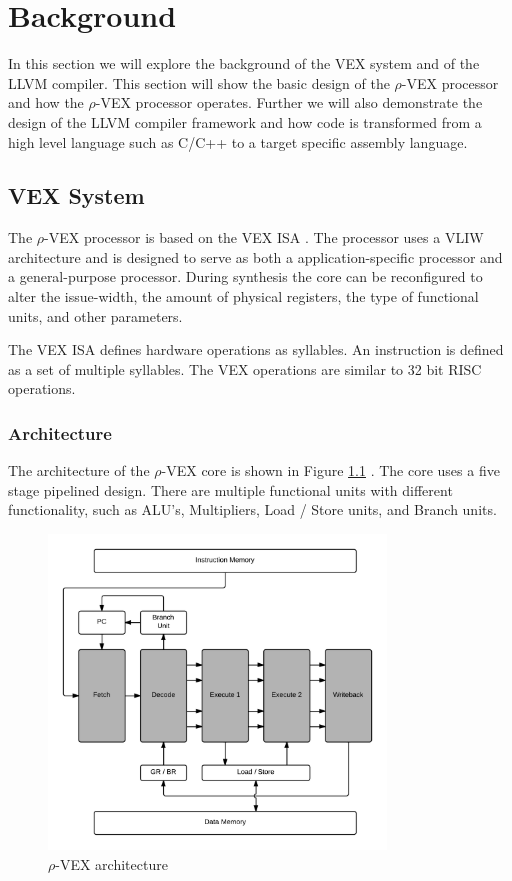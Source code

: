 \chapter{Background}
\label{chap:background}
In this section we will explore the background of the VEX system and of the LLVM compiler. This section will show the basic design of the $\rho$-VEX processor and how the $\rho$-VEX processor operates. Further we will also demonstrate the design of the LLVM compiler framework and how code is transformed from a high level language such as C/C++ to a target specific assembly language.

\section{VEX System}
The $\rho$-VEX processor is based on the VEX ISA \cite{As:2008rt}. The processor uses a VLIW architecture and is designed to serve as both a application-specific processor and a general-purpose processor. During synthesis the core can be reconfigured to alter the issue-width, the amount of physical registers, the type of functional units, and other parameters.

The VEX ISA defines hardware operations as syllables. An instruction is defined as a set of multiple syllables. The VEX operations are similar to 32 bit RISC operations.

\subsection{Architecture}
The architecture of the $\rho$-VEX core is shown in Figure \ref{fig:rvex_arch} \cite{Seedorf:2011fj}. The core uses a five stage pipelined design. There are multiple functional units with different functionality, such as ALU’s, Multipliers, Load / Store units, and Branch units.

\begin{figure}[ht]
\centering
\includegraphics[width=0.8\textwidth]{2_background/img/rvex_arch.png}
\caption{$\rho$-VEX architecture}
\label{fig:rvex_arch}
\end{figure}

